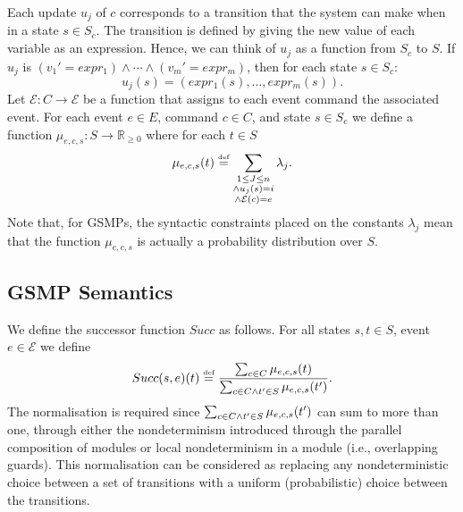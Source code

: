 \documentclass{article}
\newcommand{\eqdef}{\ensuremath{\stackrel{\text{\tiny def}}{=}}}
\newcommand{\Rsetpo}{\mathbb{R}_{\ge 0}}
\newcommand{\calE}{\mathcal{E}}
\newcommand{\events}{{\calE}}
\newcommand{\suc}{Succ}
\begin{document}
Each update $u_j$ of $c$ corresponds to a transition that the system can make when in a state $s \in S_c$. 
The transition is defined by giving the new value of each variable as an expression.
Hence, we can think of $u_j$ as a function from $S_c$ to $S$. 
If $u_j$ is $(v_1' = expr_1)\wedge \cdots \wedge (v_m'
= expr_m)$, then for each state $s \in S_c$:
$$ u_j(s) = (expr_1(s), \ldots, expr_m(s)). $$
%
%
Let $\mathcal{E}\colon C \to \events $ be a function that assigns to each event command the associated event. 
For each event $e \in E$, command $c \in C$, and state $s \in S_c$ we define a function $\mu_{e,c,s} \colon S \to \mathbb{R}_{\geq0}$ where for each $t\in S$ 
\[ \mu_{e,c,s}(t) \eqdef \sum_{\substack{
		1 \leq J \leq n \\
		\wedge u_j(s) = i \\
		\wedge \mathcal{E}(c)=e}} \lambda_j. \]
Note that, for GSMPs, the syntactic constraints placed on the constants $\lambda_j$ mean
that the function $\mu_{e,c,s}$ is actually a probability distribution over $S$.


\subsection*{GSMP Semantics}
We define the successor function $\suc$ as follows.
For all states $s,t\in S$, event $e \in \mathcal{E}$ we define
\[\suc(s,e)(t) \eqdef \frac{\sum_{c \in C} \mu_{e,c,s}(t)}{\sum_{c \in C \\ \wedge t'\in S} \mu_{e,c,s}(t')}. \]
The normalisation is required since $\sum_{c \in C \\ \wedge t'\in S} \mu_{e,c,s}(t')$ can sum to more than one, through either the nondeterminism introduced through the parallel composition of modules or local nondeterminism in a module (i.e., overlapping guards). 
This normalisation can be considered as replacing any nondeterministic choice between a set of transitions with a uniform (probabilistic) choice between the transitions.
\end{document}

